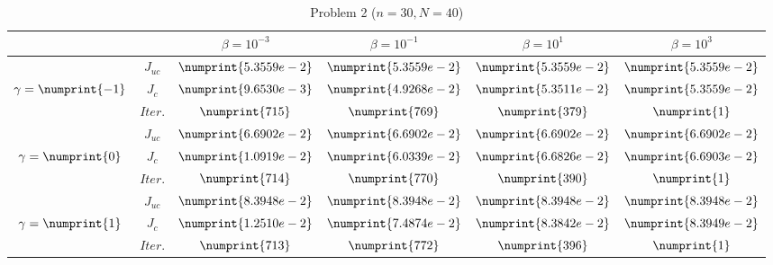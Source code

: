 \begin{table}
\begin{tabular}{ ||c|| c | c | c | c | c ||}
\hline
& & $\beta = 10^{-3}$ & $\beta = 10^{-1}$ & $\beta = 10^{1}$ & $\beta = 10^{3}$  \\
\hline
 & $J_{uc}$ & $\numprint{5.3559e-2}$ & $\numprint{5.3559e-2}$ & $\numprint{5.3559e-2}$ & $\numprint{5.3559e-2}$ \\
$\gamma= \numprint{-1}$  & $J_c$ & $\numprint{9.6530e-3}$ & $\numprint{4.9268e-2}$ & $\numprint{5.3511e-2}$ & $\numprint{5.3559e-2}$ \\
& $Iter.$ & $\numprint{715}$ & $\numprint{769}$ & $\numprint{379}$ & $\numprint{1}$ \\
\hline
 & $J_{uc}$ & $\numprint{6.6902e-2}$ & $\numprint{6.6902e-2}$ & $\numprint{6.6902e-2}$ & $\numprint{6.6902e-2}$ \\
$\gamma= \numprint{0}$  & $J_c$ & $\numprint{1.0919e-2}$ & $\numprint{6.0339e-2}$ & $\numprint{6.6826e-2}$ & $\numprint{6.6903e-2}$ \\
& $Iter.$ & $\numprint{714}$ & $\numprint{770}$ & $\numprint{390}$ & $\numprint{1}$ \\
\hline
 & $J_{uc}$ & $\numprint{8.3948e-2}$ & $\numprint{8.3948e-2}$ & $\numprint{8.3948e-2}$ & $\numprint{8.3948e-2}$ \\
$\gamma= \numprint{1}$  & $J_c$ & $\numprint{1.2510e-2}$ & $\numprint{7.4874e-2}$ & $\numprint{8.3842e-2}$ & $\numprint{8.3949e-2}$ \\
& $Iter.$ & $\numprint{713}$ & $\numprint{772}$ & $\numprint{396}$ & $\numprint{1}$ \\
\hline
\end{tabular}
\caption{Problem 2 ($n = 30,N = 40$)}
\label{TabS5:Prob2a}
\end{table}